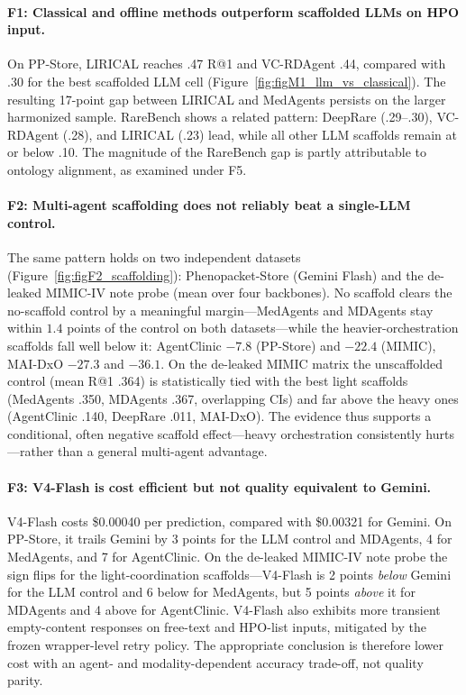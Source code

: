 \documentclass[letterpaper]{article} %
\begin{document}
\paragraph{F1: Classical and offline methods outperform scaffolded LLMs on HPO input.}
On PP-Store, LIRICAL reaches .47 R@1 and VC-RDAgent .44, compared with .30 for the best scaffolded LLM cell (Figure~\ref{fig:figM1_llm_vs_classical}). The resulting 17-point gap between LIRICAL and MedAgents persists on the larger harmonized sample. RareBench shows a related pattern: DeepRare (.29--.30), VC-RDAgent (.28), and LIRICAL (.23) lead, while all other LLM scaffolds remain at or below .10. The magnitude of the RareBench gap is partly attributable to ontology alignment, as examined under F5.

\paragraph{F2: Multi-agent scaffolding does not reliably beat a single-LLM control.}
The same pattern holds on two independent datasets (Figure~\ref{fig:figF2_scaffolding}): Phenopacket-Store (Gemini Flash) and the de-leaked MIMIC-IV note probe (mean over four backbones). No scaffold clears the no-scaffold control by a meaningful margin---MedAgents and MDAgents stay within $1.4$ points of the control on both datasets---while the heavier-orchestration scaffolds fall well below it: AgentClinic $-7.8$ (PP-Store) and $-22.4$ (MIMIC), MAI-DxO $-27.3$ and $-36.1$. On the de-leaked MIMIC matrix the unscaffolded control (mean R@1 .364) is statistically tied with the best light scaffolds (MedAgents .350, MDAgents .367, overlapping CIs) and far above the heavy ones (AgentClinic .140, DeepRare .011, MAI-DxO). The evidence thus supports a conditional, often negative scaffold effect---heavy orchestration consistently hurts---rather than a general multi-agent advantage.

\paragraph{F3: V4-Flash is cost efficient but not quality equivalent to Gemini.}
V4-Flash costs \$0.00040 per prediction, compared with \$0.00321 for Gemini. On PP-Store, it trails Gemini by 3 points for the LLM control and MDAgents, 4 for MedAgents, and 7 for AgentClinic. On the de-leaked MIMIC-IV note probe the sign flips for the light-coordination scaffolds---V4-Flash is 2 points \emph{below} Gemini for the LLM control and 6 below for MedAgents, but 5 points \emph{above} it for MDAgents and 4 above for AgentClinic. V4-Flash also exhibits more transient empty-content responses on free-text and HPO-list inputs, mitigated by the frozen wrapper-level retry policy. The appropriate conclusion is therefore lower cost with an agent- and modality-dependent accuracy trade-off, not quality parity.
\end{document}
